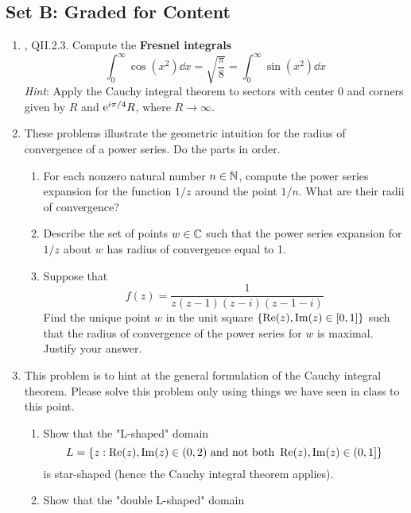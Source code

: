 \documentclass[../psets.tex]{subfiles}
\begin{document}
\subsection*{Set B: Graded for Content}
\begin{enumerate}[label={\textbf{\arabic*.}}]
    \item \textcite{bib:FischerLieb}, QII.2.3. Compute the \textbf{Fresnel integrals}
    \begin{equation*}
        \int_0^\infty\cos(x^2)\dd{x} = \sqrt{\frac{\pi}{8}}
        = \int_0^\infty\sin(x^2)\dd{x}
    \end{equation*}
    \emph{Hint}: Apply the Cauchy integral theorem to sectors with center 0 and corners given by $R$ and $\e[i\pi/4]R$, where $R\to\infty$.
    \item These problems illustrate the geometric intuition for the radius of convergence of a power series. Do the parts in order.
    \begin{enumerate}
        \item For each nonzero natural number $n\in\N$, compute the power series expansion for the function $1/z$ around the point $1/n$. What are their radii of convergence?
        \item Describe the set of points $w\in\C$ such that the power series expansion for $1/z$ about $w$ has radius of convergence equal to 1.
        \item Suppose that 
        \begin{equation*}
            f(z) = \frac{1}{z(z-1)(z-i)(z-1-i)}
        \end{equation*}
        Find the unique point $w$ in the unit square $\{\re(z),\im(z)\in[0,1]\}$ such that the radius of convergence of the power series for $w$ is maximal. Justify your answer.
    \end{enumerate}
    \item This problem is to hint at the general formulation of the Cauchy integral theorem. Please solve this problem only using things we have seen in class to this point.
    \begin{enumerate}
        \item Show that the "L-shaped" domain
        \begin{equation*}
            L = \{z:\re(z),\im(z)\in(0,2)\text{ and not both }\re(z),\im(z)\in(0,1]\}
        \end{equation*}
        is star-shaped (hence the Cauchy integral theorem applies).
        \item Show that the "double L-shaped" domain

\end{enumerate}
\end{enumerate}
\end{document}
